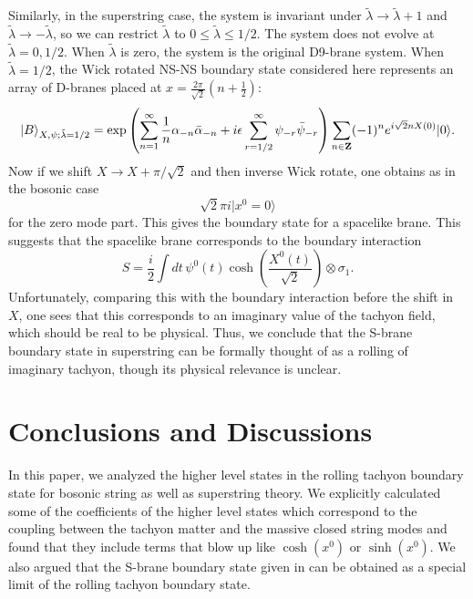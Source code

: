 \documentclass[a4paper,12pt]{article} \textheight=8.5truein
\newcommand{\ra}{\rightarrow}
\newcommand{\tlambda}{\tilde{\lambda}}
\begin{document}
Similarly, in the superstring case, the system is invariant under
$\tlambda \ra\tlambda+1$ and $\tlambda\ra-\tlambda$, so we can
restrict $\tlambda$ to $0\le\tlambda\le1/2$. The system does not
evolve at $\tilde{\lambda}=0, 1/2$. When $\tilde{\lambda}$ is
zero, the system is the original D9-brane system. When
$\tilde{\lambda}= 1/2$, the Wick rotated NS-NS boundary
state considered here represents an array of D-branes placed at
$x=\frac{2\pi}{\sqrt{2}}(n+\frac{1}{2})$:
\begin{equation}
    |B\rangle_{X,\psi;\tilde{\lambda}=1/2}
=\exp\left(
\sum_{n=1}^{\infty}\frac{1}{n}\alpha_{-n}\bar{\alpha}_{-n}
+i\epsilon\sum_{r=1/2}^{\infty}\psi_{-r}\bar{\psi}_{-r}
\right)\sum_{n \in {\bf Z}}(-1)^n
e^{i\sqrt{2}n X(0)}
|0\rangle.
\end{equation}
Now if we shift $X\rightarrow X+\pi/\sqrt{2}$ and then
inverse Wick rotate, one obtains as in the bosonic case
\begin{equation}
  \sqrt{2}\pi i|x^0=0\rangle
\end{equation}
for the zero mode part. This gives the boundary state for a
spacelike brane. This suggests that the spacelike brane
corresponds to the boundary interaction
\begin{equation}\label{s-brane action}
    S=
\frac{i}{2}\int dt\, \psi^0(t)\cosh\left(\frac{X^0(t)}{\sqrt{2}}\right)
\otimes\sigma_1.
\end{equation}
Unfortunately, comparing this with the boundary interaction before the
shift in $X$, one sees that this corresponds to an imaginary value
of the tachyon field, which should be real to be physical.
Thus, we conclude that the S-brane boundary state in superstring
can be formally
thought of as a rolling of imaginary tachyon, though
its physical relevance is unclear.

\section{Conclusions and Discussions} \label{discussions}

In this paper, we analyzed the higher level states in the rolling
tachyon boundary state for bosonic string as well as superstring
theory. We explicitly calculated some of the coefficients of the
higher level states which correspond to the coupling between the
tachyon matter and the massive closed string modes and found that
they include terms that blow up like $\cosh(x^0)$ or $\sinh(x^0)$.
We also argued that the S-brane boundary state given in
\cite{Gutperle:2002ai} can be obtained as a special limit of the
rolling tachyon boundary state.
\end{document}
